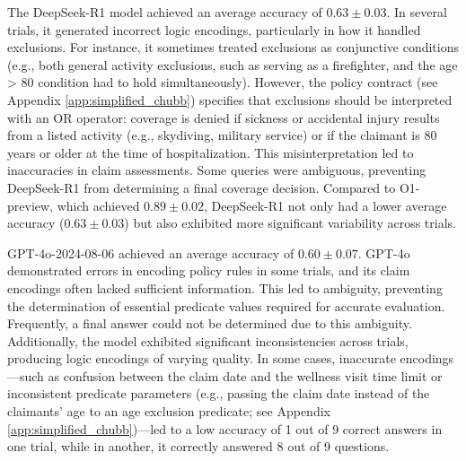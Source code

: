 The DeepSeek-R1 model achieved an average accuracy of $0.63 \pm 0.03$. In several trials, it generated incorrect logic encodings, particularly in how it handled exclusions. For instance, it sometimes treated exclusions as conjunctive conditions (e.g., both general activity exclusions, such as serving as a firefighter, and the age > 80 condition had to hold simultaneously). However, the policy contract (see Appendix \ref{app:simplified_chubb}) specifies that exclusions should be interpreted with an OR operator: coverage is denied if sickness or accidental injury results from a listed activity (e.g., skydiving, military service) or if the claimant is 80 years or older at the time of hospitalization. This misinterpretation led to inaccuracies in claim assessments. Some queries were ambiguous, preventing DeepSeek-R1 from determining a final coverage decision. Compared to O1-preview, which achieved $0.89 \pm 0.02$, DeepSeek-R1 not only had a lower average accuracy ($0.63 \pm 0.03$) but also exhibited more significant variability across trials.


GPT-4o-2024-08-06 achieved an average accuracy of $0.60 \pm 0.07$. GPT-4o demonstrated errors in encoding policy rules in some trials, and its claim encodings often lacked sufficient information. This led to ambiguity, preventing the determination of essential predicate values required for accurate evaluation. Frequently, a final answer could not be determined due to this ambiguity. Additionally, the model exhibited significant inconsistencies across trials, producing logic encodings of varying quality. In some cases, inaccurate encodings—such as confusion between the claim date and the wellness visit time limit or inconsistent predicate parameters (e.g., passing the claim date instead of the claimants' age to an age exclusion predicate; see Appendix \ref{app:simplified_chubb})—led to a low accuracy of 1 out of 9 correct answers in one trial, while in another, it correctly answered 8 out of 9 questions.

